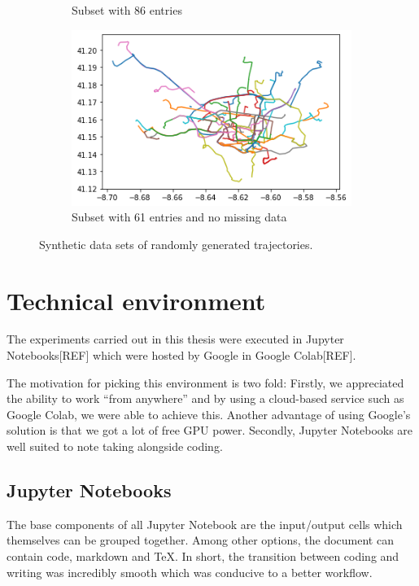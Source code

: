 \begin{figure}
\begin{subfigure}{.30\textwidth}
        \caption{Subset with 86 entries}
        \label{sfig:real-mini}
    \end{subfigure}
    \hfill
    \begin{subfigure}{.30\textwidth}
        \centering
        \includegraphics[width=\textwidth]{figures/REAL_NO_MISS.png}
        \caption{Subset with 61 entries and no missing data}
        \label{sfig:real-no-miss}
    \end{subfigure}
    \caption{Synthetic data sets of randomly generated trajectories.}
    \label{fig:real-datasets}
\end{figure}


\section{Technical environment}
The experiments carried out in this thesis were executed in Jupyter Notebooks[REF] which were hosted by Google in Google Colab[REF].

The motivation for picking this environment is two fold: Firstly, we appreciated the ability to work “from anywhere” and by using a cloud-based service such as Google Colab, we were able to achieve this. 
Another advantage of using Google's solution is that we got a lot of free GPU power. Secondly, Jupyter Notebooks are well suited to note taking alongside coding. 

\subsection{Jupyter Notebooks}
The base components of all Jupyter Notebook are the input/output cells which themselves can be grouped together. 
Among other options, the document can contain code, markdown and TeX. In short, the transition between coding and writing was incredibly smooth which was conducive to a better workflow.


